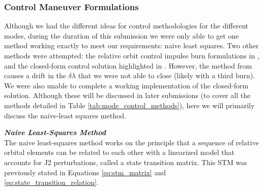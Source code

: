 \subsubsection{Control Maneuver Formulations}



Although we had the different ideas for control methodologies for the different modes, during the duration of this submission we were only able to get one method working exactly to meet our requirements: naive least squares. Two other methods were attempted: the relative orbit control impulse burn formulations in \cite{damicothesis}, and the closed-form control solution highlighted in \cite{chernick2021optimal}. However, the method from \cite{damicothesis} causes a drift in the $\delta \lambda$ that we were not able to close (likely with a third burn). We were also unable to complete a working implementation of the closed-form solution. Although these will be discussed in later submissions (to cover all the methods detailed in Table \ref{tab:mode_control_methods}), here we will primarily discuss the naive-least squares method.

\textit{\textbf{Naive Least-Squares Method}}\\
The naive least-squares method works on the principle that a sequence of relative orbital elements can be related to each other with a linearized model that accounts for J2 perturbations, called a state transition matrix. This STM was previously stated in Equations \ref{eq:stm_matrix} and \ref{eq:state_transition_relation}. 

